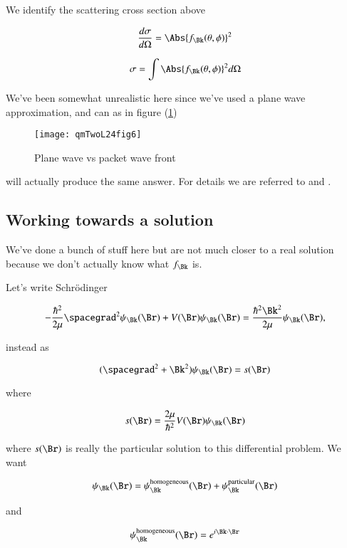 We identify the scattering cross section above

\begin{equation}\label{eqn:qmTwoL24:250}
\frac{d\sigma}{d\Omega}
=
\Abs{f_\Bk(\theta, \phi)}^2
\end{equation}

\begin{equation}\label{eqn:qmTwoL24:270}
\sigma = \int \Abs{f_\Bk(\theta, \phi)}^2 d\Omega
\end{equation}

We've been somewhat unrealistic here since we've used a plane wave approximation, and can as in figure (\ref{fig:qmTwoL24:qmTwoL24fig6})

\begin{figure}[htp]
   \centering
   \texttt{[image: qmTwoL24fig6]}
   \caption{Plane wave vs packet wave front}\label{fig:qmTwoL24:qmTwoL24fig6}
\end{figure}

will actually produce the same answer.  For details we are referred to \cite{messiah1999quantum} and \cite{taylor1972scattering}.

\subsection{Working towards a solution}

We've done a bunch of stuff here but are not much closer to a real solution because we don't actually know what $f_\Bk$ is.

Let's write Schr\"{o}dinger

\begin{equation}\label{eqn:qmTwoL24:290}
-\frac{\hbar^2}{2\mu} \spacegrad^2
\psi_\Bk(\Br)
+ V(\Br)
\psi_\Bk(\Br)
=
\frac{\hbar^2 \Bk^2}{2 \mu}
\psi_\Bk(\Br),
\end{equation}

instead as

\begin{equation}\label{eqn:qmTwoL24:310}
(\spacegrad^2 + \Bk^2)
\psi_\Bk(\Br)
= s(\Br)
\end{equation}

where

\begin{equation}\label{eqn:qmTwoL24:330}
s(\Br) = \frac{2\mu}{\hbar^2} V(\Br) \psi_\Bk(\Br)
\end{equation}

where $s(\Br)$ is really the particular solution to this differential problem.   We want

\begin{equation}\label{eqn:qmTwoL24:350}
\psi_\Bk(\Br) =
\psi_\Bk^{\text{homogeneous}}(\Br)
+ \psi_\Bk^{\text{particular}}(\Br)
\end{equation}

and

\begin{equation}\label{eqn:qmTwoL24:370}
\psi_\Bk^{\text{homogeneous}}(\Br) = e^{i \Bk \cdot \Br}
\end{equation}

\EndArticle
